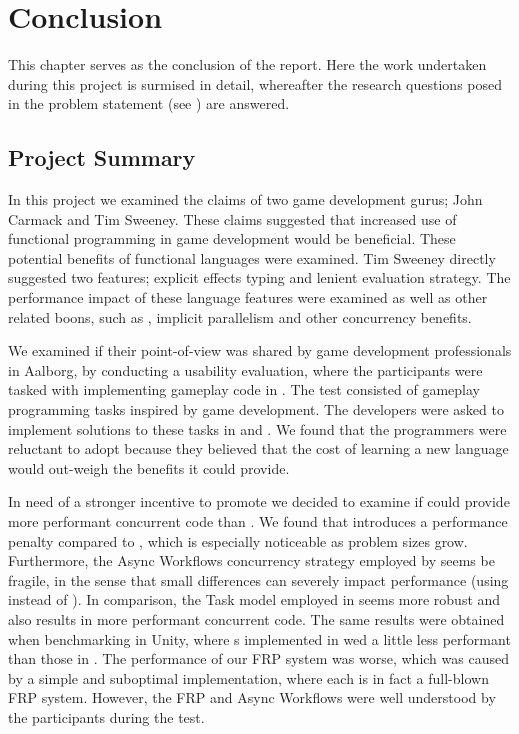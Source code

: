 \chapter{Conclusion}
This chapter serves as the conclusion of the report. Here the work undertaken during this project is surmised in detail, whereafter the research questions posed in the problem statement (see ) are answered.

\section{Project Summary}
In this project we examined the claims of two game development gurus; John Carmack and Tim Sweeney. These claims suggested that increased use of functional programming in game development would be beneficial. These potential benefits of functional languages were examined. Tim Sweeney directly suggested two features; explicit effects typing and lenient evaluation strategy. The performance impact of these language features were examined as well as other related boons, such as , implicit parallelism and other concurrency benefits.

We examined if their point-of-view was shared by game development professionals in Aalborg, by conducting a usability evaluation, where the participants were tasked with implementing gameplay code in \fs. The test consisted of gameplay programming tasks inspired by game development. The developers were asked to implement solutions to these tasks in \fs and \cs. We found that the programmers were reluctant to adopt \fs because they believed that the cost of learning a new language would out-weigh the benefits it could provide.

In need of a stronger incentive to promote \fs we decided to examine if \fs could provide more performant concurrent code than \cs. We found that \fs introduces a performance penalty compared to \cs, which is especially noticeable as problem sizes grow. Furthermore, the Async Workflows concurrency strategy employed by \fs seems be fragile, in the sense that small differences can severely impact performance (using  instead of ). In comparison, the Task model employed in \cs seems more robust and also results in more performant concurrent code. The same results were obtained when benchmarking \fs in Unity, where s implemented in \fs wed a little less performant than those in \cs. The performance of our \gls{FRP} system was worse, which was caused by a simple and suboptimal implementation, where each  is in fact a full-blown \gls{FRP} system. However, the \gls{FRP} and Async Workflows were well understood by the participants during the test.

